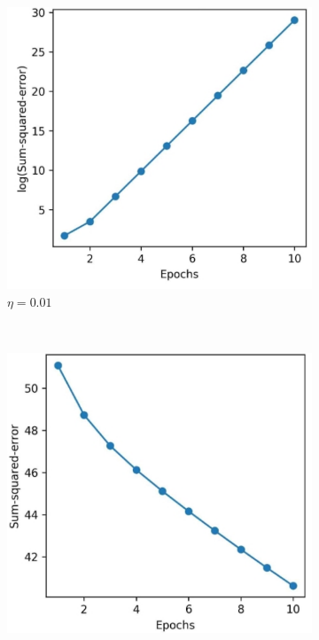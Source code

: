 \documentclass[11pt]{article}
\begin{document}
    \begin{figure}[hbt!]
        \centering
        \begin{subfigure}[t]{.48\textwidth}
            \centering
            \includegraphics[width=\columnwidth,trim=4 4 4 4,clip]{img/ada_learn_rate_001.png}
            \caption{$\eta=0.01$}
            \label{fig:ada_learn_rate_001}
        \end{subfigure}
        ~ %
        \begin{subfigure}[t]{.48\textwidth}
            \centering
            \includegraphics[width=\columnwidth,trim=4 4 4 4,clip]{img/ada_learn_rate_00001.png}

\end{subfigure}
\end{figure}
\end{document}
